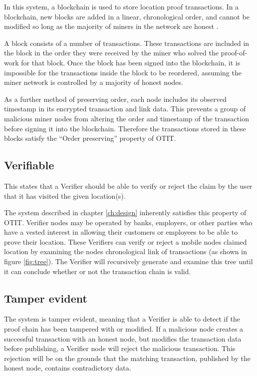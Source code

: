 In this system, a blockchain is used to store location proof transactions. In a blockchain, new blocks are added in a linear, chronological order, and cannot be modified so long as the majority of miners in the network are honest \cite{blueprint}.

A block consists of a number of transactions. These transactions are included in the block in the order they were received by the miner who solved the proof-of-work for that block. Once the block has been signed into the blockchain, it is impossible for the transactions inside the block to be reordered, assuming the miner network is controlled by a majority of honest nodes.

As a further method of preserving order, each node includes its observed timestamp in its encrypted transaction and link data. This prevents a group of malicious miner nodes from altering the order and timestamp of the transaction before signing it into the blockchain. Therefore the transactions stored in these blocks satisfy the ``Order preserving'' property of OTIT.

\subsection{Verifiable}
This states that a Verifier should be able to verify or reject the claim by the user that it has visited the given location(s).

The system described in chapter \ref{ch:design} inherently satisfies this property of OTIT. Verifier nodes may be operated by banks, employers, or other parties who have a vested interest in allowing their customers or employees to be able to prove their location. These Verifiers can verify or reject a mobile nodes claimed location by examining the nodes chronological link of transactions (as shown in figure \ref{fig:tree}). The Verifier will recursively generate and examine this tree until it can conclude whether or not the transaction chain is valid.

\subsection{Tamper evident}
The system is tamper evident, meaning that a Verifier is able to detect if the proof chain has been tampered with or modified. If a malicious node creates a successful transaction with an honest node, but modifies the transaction data before publishing, a Verifier node will reject the malicious transaction. This rejection will be on the grounds that the matching transaction, published by the honest node, contains contradictory data.

